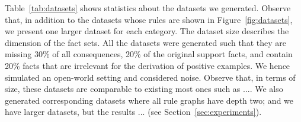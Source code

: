 Table~\ref{tab:datasets} shows statistics about the datasets we generated.
Observe that, in addition to the datasets whose rules are shown in Figure~\ref{fig:datasets}, we present one larger dataset for each category.
The dataset size describes the dimension of the fact sets.
All the datasets were generated such that they are missing 30\% of all consequences,  20\% of the original support facts, and contain 20\% facts that are irrelevant for the derivation of positive examples. We hence simulated an open-world setting and considered noise.
Observe that, in terms of size, these datasets are comparable to existing most ones such as .... We also generated corresponding datasets where all rule graphs have depth two; and we have larger datasets, but the results ... (see Section~\ref{sec:experiments}).





